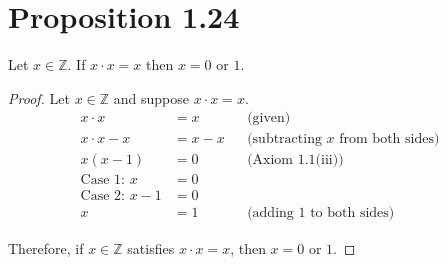 \section*{Proposition 1.24}
Let $x \in \mathbb{Z}$. If $x \cdot x = x$ then $x = 0$ or $1$.
\begin{proof}
    Let $x \in \mathbb{Z}$ and suppose $x \cdot x = x$.
    \begin{align*}
        x \cdot x             & = x     &  & \text{(given)}                           \\
        x \cdot x - x         & = x - x &  & \text{(subtracting $x$ from both sides)} \\
        x(x - 1)              & = 0     &  & \text{(Axiom 1.1(iii))}                  \\
        \text{Case 1: } x     & = 0                                                   \\
        \text{Case 2: } x - 1 & = 0                                                   \\
        x                     & = 1     &  & \text{(adding $1$ to both sides)}
    \end{align*}

    Therefore, if $x \in \mathbb{Z}$ satisfies $x \cdot x = x$, then $x = 0$ or $1$.
\end{proof}



